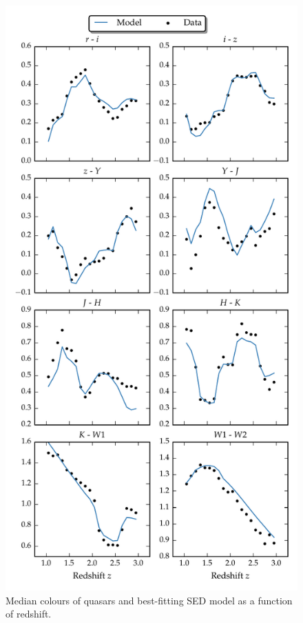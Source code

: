 \begin{figure}
\includegraphics[width=\textwidth]{figures/chapter05/sed_color_plot.pdf}
\caption[{Median colours of quasars and best-fitting SED model as a function of redshift.}]{Median colours of quasars and best-fitting SED model as a function of redshift.}
  \label{fig:color}
\end{figure} 

